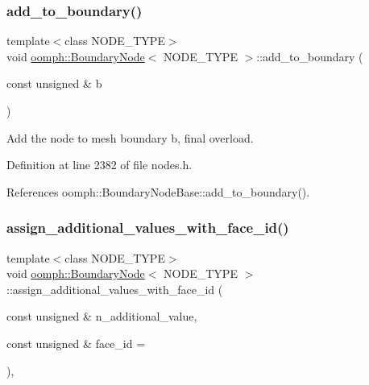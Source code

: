 \subsubsection{\texorpdfstring{add\+\_\+to\+\_\+boundary()}{add\_to\_boundary()}}
{\footnotesize\ttfamily template$<$class N\+O\+D\+E\+\_\+\+T\+Y\+PE$>$ \\
void \hyperlink{classoomph_1_1BoundaryNode}{oomph\+::\+Boundary\+Node}$<$ N\+O\+D\+E\+\_\+\+T\+Y\+PE $>$\+::add\+\_\+to\+\_\+boundary (\begin{DoxyParamCaption}\item[{const unsigned \&}]{b }\end{DoxyParamCaption})\hspace{0.3cm}{\ttfamily [inline]}}



Add the node to mesh boundary b, final overload. 



Definition at line 2382 of file nodes.\+h.



References oomph\+::\+Boundary\+Node\+Base\+::add\+\_\+to\+\_\+boundary().

\mbox{\label{classoomph_1_1BoundaryNode_a04ba9bf0b13ec5a8da2e2a27d41a1ef5}} 
\subsubsection{\texorpdfstring{assign\+\_\+additional\+\_\+values\+\_\+with\+\_\+face\+\_\+id()}{assign\_additional\_values\_with\_face\_id()}}
{\footnotesize\ttfamily template$<$class N\+O\+D\+E\+\_\+\+T\+Y\+PE$>$ \\
void \hyperlink{classoomph_1_1BoundaryNode}{oomph\+::\+Boundary\+Node}$<$ N\+O\+D\+E\+\_\+\+T\+Y\+PE $>$\+::assign\+\_\+additional\+\_\+values\+\_\+with\+\_\+face\+\_\+id (\begin{DoxyParamCaption}\item[{const unsigned \&}]{n\+\_\+additional\+\_\+value,  }\item[{const unsigned \&}]{face\+\_\+id = {} }\end{DoxyParamCaption})\hspace{0.3cm}{\ttfamily [inline]}, {\ttfamily [virtual]}}

